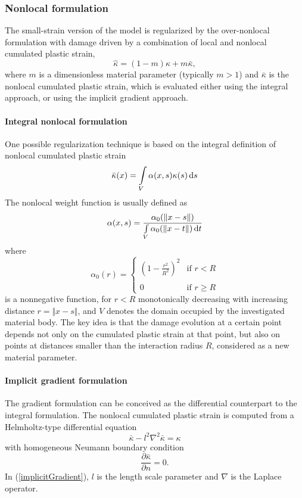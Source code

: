 \documentclass[a4paper]{article}
\begin{document}
\subsubsection{Nonlocal formulation}
The small-strain version of the model is regularized by the over-nonlocal formulation with damage driven by a combination of local and nonlocal cumulated plastic strain,
\begin{equation}\label{overKappa1}
\hat{\kappa} = (1-m)\kappa + m\bar{\kappa},
\end{equation}
where $m$ is a dimensionless material parameter (typically $m>1$) and $\bar{\kappa}$ is the nonlocal cumulated plastic strain, which is evaluated either using the integral approach,
or using the implicit gradient approach.

\paragraph{Integral nonlocal formulation}
One possible regularization technique is based on the integral definition of nonlocal
  cumulated plastic strain
\begin{equation}\label{nonLocalPlStrain1}
\bar{\kappa}(x) = \int\limits_V \alpha(x,s)\kappa(s)\,{\rm d}s
\end{equation}
The nonlocal weight function is usually defined as
\begin{equation}
\alpha(x,s) = \frac{\alpha_0(\Vert x-s\Vert )}{\int\limits_V\alpha_0(\Vert x-t\Vert )\,{\rm d}t}
\end{equation}
where
\begin{equation}\label{alpha0}
\alpha_0(r) = \begin{cases} \left(1-\frac{r^2}{R^2}\right)^2 &\text{if $r<R$}\\ 
\\
							0 & \text{if $r \ge R$}
			  \end{cases}
\end{equation}
is a nonnegative function, for $r<R$ monotonically decreasing with increasing distance $r=\Vert x-s\Vert$, and $V$ denotes the domain occupied by the investigated material body.
The key idea is that the damage evolution at a certain point depends not only on the cumulated plastic strain at that point, but also on points at distances smaller than the interaction radius $R$, considered as a new material parameter. 
\paragraph{Implicit gradient formulation}
The gradient formulation can be conceived as the differential counterpart to the integral formulation. The nonlocal cumulated plastic strain is computed from a Helmholtz-type differential equation 
\begin{equation}\label{implicitGradient}
\bar{\kappa} - l^2\nabla^2\bar{\kappa} = \kappa
\end{equation}
with homogeneous Neumann boundary condition
\begin{equation}\label{neumannBC}
\frac{\partial\bar{\kappa}}{\partial n} = 0.
\end{equation} In (\ref{implicitGradient}), $l$ is the length scale parameter and $\nabla$ is the Laplace operator. 
\end{document}
